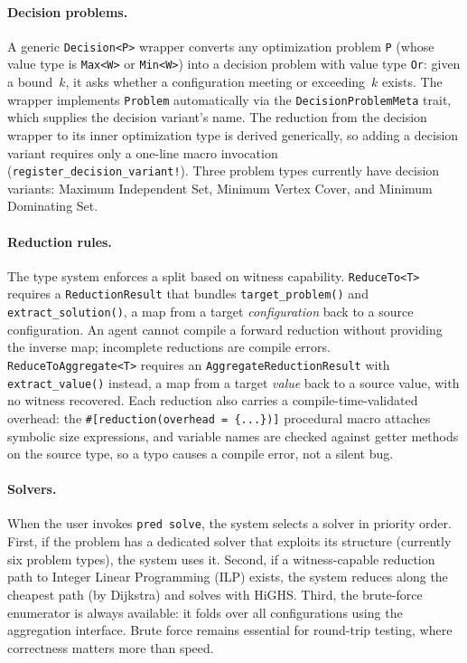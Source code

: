 \documentclass[conference]{IEEEtran}
\begin{document}
\paragraph{Decision problems.}
A generic \texttt{Decision<P>} wrapper converts any optimization problem \texttt{P} (whose value type is \texttt{Max<W>} or \texttt{Min<W>}) into a decision problem with value type \texttt{Or}: given a bound~$k$, it asks whether a configuration meeting or exceeding~$k$ exists.
The wrapper implements \texttt{Problem} automatically via the \texttt{DecisionProblemMeta} trait, which supplies the decision variant's name.
The reduction from the decision wrapper to its inner optimization type is derived generically, so adding a decision variant requires only a one-line macro invocation (\texttt{register\_decision\_variant!}). 
Three problem types currently have decision variants: Maximum Independent Set, Minimum Vertex Cover, and Minimum Dominating Set.

\paragraph{Reduction rules.}
The type system enforces a split based on witness capability.
\texttt{ReduceTo<T>} requires a \texttt{ReductionResult} that bundles \texttt{target\_problem()} and \texttt{extract\_solution()}, a map from a target \emph{configuration} back to a source configuration.
An agent cannot compile a forward reduction without providing the inverse map; incomplete reductions are compile errors.
\texttt{ReduceToAggregate<T>} requires an \texttt{AggregateReductionResult} with \texttt{extract\_value()} instead, a map from a target \emph{value} back to a source value, with no witness recovered.
Each reduction also carries a compile-time-validated overhead: the \texttt{\#[reduction(overhead = \{...\})]} procedural macro attaches symbolic size expressions, and variable names are checked against getter methods on the source type, so a typo causes a compile error, not a silent bug.

\paragraph{Solvers.}
When the user invokes \texttt{pred solve}, the system selects a solver in priority order.
First, if the problem has a dedicated solver that exploits its structure (currently six problem types), the system uses it.
Second, if a witness-capable reduction path to Integer Linear Programming (ILP) exists, the system reduces along the cheapest path (by Dijkstra) and solves with HiGHS.
Third, the brute-force enumerator is always available: it folds over all configurations using the aggregation interface.
Brute force remains essential for round-trip testing, where correctness matters more than speed.
\end{document}
